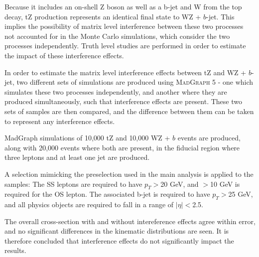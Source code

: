 
Because it includes an on-shell Z boson as well as a b-jet and W from the top decay, tZ production represents an identical final state  to WZ + $b$-jet. This implies the possibility of matrix level interference between these two processes not accounted for in the Monte Carlo simulations, which consider the two processes independently. Truth level studies are performed in order to estimate the impact of these interference effects.    

In order to estimate the matrix level interference effects between tZ and WZ + $b$-jet, two different sets of simulations are produced using \textsc{MadGraph} 5 \cite{Frederix_2018} - one which simulates these two processes independently, and another where they are  produced simultaneously, such that interference effects are present. These two sets of samples are then compared, and the difference between them can be taken to represent any interference effects.

MadGraph simulations of 10,000 tZ and 10,000 WZ + $b$ events are produced, along with 20,000 events where both are present, in the fiducial region where three leptons and at least one jet are produced.  

A selection mimicking the preselection used in the main analysis is applied to the samples: The SS leptons are required to have $p_T>$20 GeV, and $>$10 GeV is required for the OS lepton. The associated b-jet is required to have $p_T>$25 GeV, and all physics objects are required to fall in a range of $|\eta|<$2.5. 



The overall cross-section with and without intereference effects agree within error, and no significant differences in the kinematic distributions are seen. It is therefore concluded that interference effects do not significantly impact the results.
